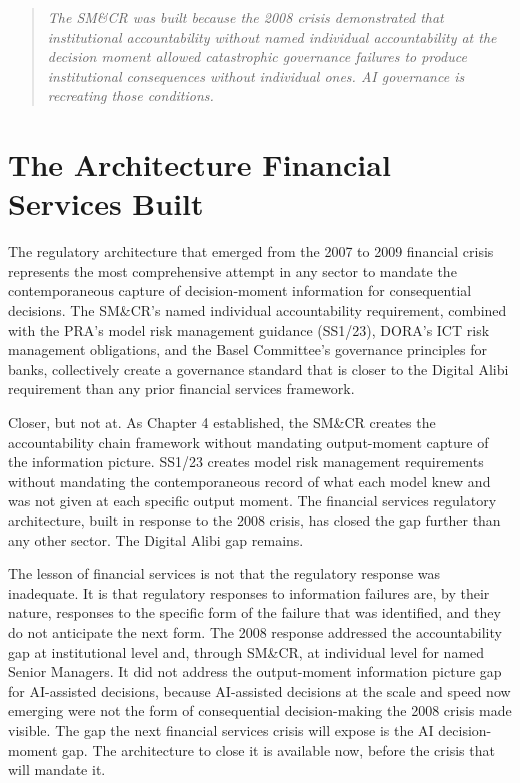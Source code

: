 \begin{quote}
\emph{The SM\&CR was built because the 2008 crisis demonstrated that institutional accountability without named individual accountability at the decision moment allowed catastrophic governance failures to produce institutional consequences without individual ones. AI governance is recreating those conditions.}
\end{quote}

\scenebreak

\section{The Architecture Financial Services Built}

The regulatory architecture that emerged from the 2007 to 2009 financial crisis represents the most comprehensive attempt in any sector to mandate the contemporaneous capture of decision-moment information for consequential decisions. The SM\&CR's named individual accountability requirement, combined with the PRA's model risk management guidance (SS1/23), DORA's ICT risk management obligations, and the Basel Committee's governance principles for banks, collectively create a governance standard that is closer to the Digital Alibi requirement than any prior financial services framework.

Closer, but not at. As Chapter 4 established, the SM\&CR creates the accountability chain framework without mandating output-moment capture of the information picture. SS1/23 creates model risk management requirements without mandating the contemporaneous record of what each model knew and was not given at each specific output moment. The financial services regulatory architecture, built in response to the 2008 crisis, has closed the gap further than any other sector. The Digital Alibi gap remains.

The lesson of financial services is not that the regulatory response was inadequate. It is that regulatory responses to information failures are, by their nature, responses to the specific form of the failure that was identified, and they do not anticipate the next form. The 2008 response addressed the accountability gap at institutional level and, through SM\&CR, at individual level for named Senior Managers. It did not address the output-moment information picture gap for AI-assisted decisions, because AI-assisted decisions at the scale and speed now emerging were not the form of consequential decision-making the 2008 crisis made visible. The gap the next financial services crisis will expose is the AI decision-moment gap. The architecture to close it is available now, before the crisis that will mandate it.

